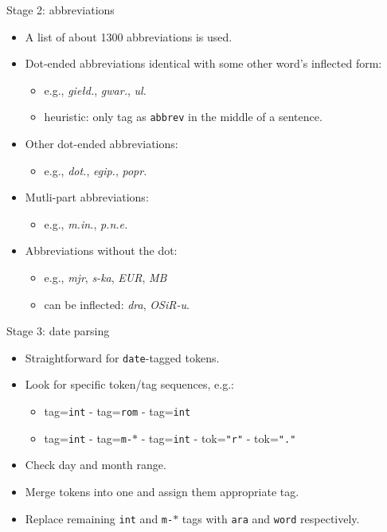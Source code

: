 \documentclass[12pt]{beamer}
\begin{document}
\begin{frame}{Stage 2: abbreviations}
    \begin{itemize}
        \item A list of about 1300 abbreviations is used.
        \item Dot-ended abbreviations identical with some other word's inflected form:
            \begin{itemize}
                \item e.g., \textit{giełd.}, \textit{gwar.}, \textit{ul.}
                \item heuristic: only tag as \texttt{abbrev} in the middle of a sentence.
            \end{itemize}
        \item Other dot-ended abbreviations:
            \begin{itemize}
                \item e.g., \textit{dot.}, \textit{egip.}, \textit{popr.}
            \end{itemize}
        \item Mutli-part abbreviations:
            \begin{itemize}
                \item e.g., \textit{m.in.}, \textit{p.n.e.}
            \end{itemize}
        \item Abbreviations without the dot:
            \begin{itemize}
                \item e.g., \textit{mjr}, \textit{s-ka}, \textit{EUR}, \textit{MB}
                \item can be inflected: \textit{dra}, \textit{OSiR-u}.
            \end{itemize}
    \end{itemize}
\end{frame}
\begin{frame}{Stage 3: date parsing}
    \begin{itemize}
        \item Straightforward for \texttt{date}-tagged tokens.
        \item Look for specific token/tag sequences, e.g.:
            \begin{itemize}
                \item tag=\texttt{int} - tag=\texttt{rom} - tag=\texttt{int}
                \item tag=\texttt{int} - tag=\texttt{m-$\ast$} - tag=\texttt{int} - tok=\texttt{"r"} - tok=\texttt{"."}
            \end{itemize}
        \item Check day and month range.
        \item Merge tokens into one and assign them appropriate tag.
        \item Replace remaining \texttt{int} and \texttt{m-$\ast$} tags with \texttt{ara} and \texttt{word} respectively.
    \end{itemize}
\end{frame}
\end{document}
